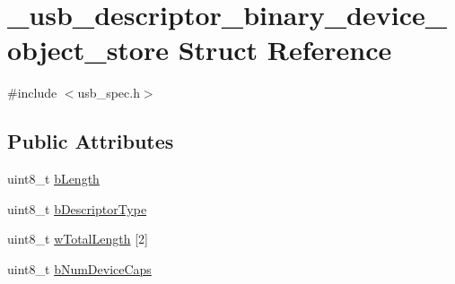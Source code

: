 \hypertarget{struct__usb__descriptor__binary__device__object__store}{\section{\-\_\-usb\-\_\-descriptor\-\_\-binary\-\_\-device\-\_\-object\-\_\-store Struct Reference}
\label{struct__usb__descriptor__binary__device__object__store}
}


{\ttfamily \#include $<$usb\-\_\-spec.\-h$>$}

\subsection*{Public Attributes}
\begin{DoxyCompactItemize}
\item 
uint8\-\_\-t \hyperlink{struct__usb__descriptor__binary__device__object__store_ad42f97b9529581e7b752cfa785ed7969}{b\-Length}
\item 
uint8\-\_\-t \hyperlink{struct__usb__descriptor__binary__device__object__store_afddef2a6b23d7ddf9bea075428a84d8b}{b\-Descriptor\-Type}
\item 
uint8\-\_\-t \hyperlink{struct__usb__descriptor__binary__device__object__store_a01e75ad6e3e292f57f2008350990e3c8}{w\-Total\-Length} \mbox{[}2\mbox{]}
\item 
uint8\-\_\-t \hyperlink{struct__usb__descriptor__binary__device__object__store_a10f8e3b019a36911e619043fe2aefa8b}{b\-Num\-Device\-Caps}
\end{DoxyCompactItemize}


